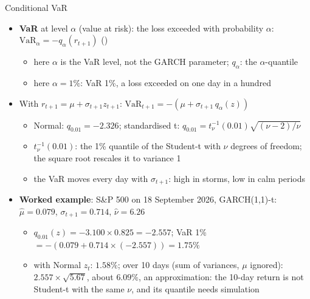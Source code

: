 \begin{frame}{Conditional VaR}
\itemsize{\small}
\begin{itemize}
    \item \textbf{VaR} at level $\alpha$ (value at risk): the loss exceeded with probability $\alpha$: $\mathrm{VaR}_\alpha = -q_\alpha(r_{t+1})$ ()
    \begin{itemize}
        \item here $\alpha$ is the VaR level, not the GARCH parameter; $q_\alpha$: the $\alpha$-quantile
        \item here $\alpha = 1\%$: VaR 1\%, a loss exceeded on one day in a hundred
    \end{itemize}
    \item With $r_{t+1} = \mu + \sigma_{t+1}z_{t+1}$: $\mathrm{VaR}_{t+1} = -(\mu + \sigma_{t+1}\,q_\alpha(z))$
    \begin{itemize}
        \item Normal: $q_{0.01} = -2.326$; standardised t: $q_{0.01} = t_\nu^{-1}(0.01)\sqrt{(\nu - 2)/\nu}$
        \item $t_\nu^{-1}(0.01)$: the 1\% quantile of the Student-t with $\nu$ degrees of freedom; the square root rescales it to variance 1
        \item the VaR moves every day with $\sigma_{t+1}$: high in storms, low in calm periods
    \end{itemize}
    \item \textbf{Worked example}: S\&P 500 on 18 September 2026, GARCH(1,1)-t: $\hat\mu = 0.079$, $\sigma_{t+1} = 0.714$, $\hat\nu = 6.26$
    \begin{itemize}
        \item $q_{0.01}(z) = -3.100 \times 0.825 = -2.557$; VaR 1\% $= -(0.079 + 0.714 \times (-2.557)) = 1.75\%$
        \item with Normal $z_t$: $1.58\%$; over 10 days (sum of variances, $\mu$ ignored): $2.557 \times \sqrt{5.67}$, about $6.09\%$, an approximation: the 10-day return is not Student-t with the same $\nu$, and its quantile needs simulation
    \end{itemize}
\end{itemize}
\end{frame}

